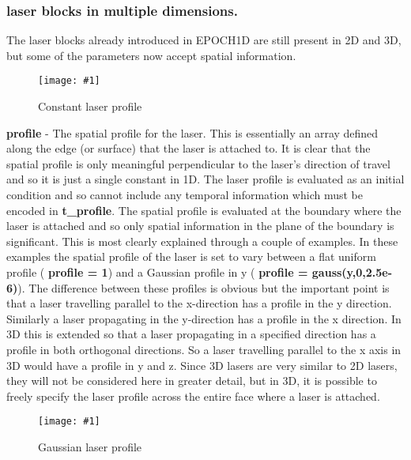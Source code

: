 \documentclass[12pt,a4paper]{article}
\newcommand{\emphtext}{\color{warwickdark} \fontfamily{phv}\selectfont\large\bf}
\newcommand{\inlineemph}[1]{{\color{warwicklight} \bf{#1}}}
\newcommand{\scaledcapimage}[4]
  {{\begin{figure}[hbt!]\centering\texttt{[image: \#1]}\caption{#3}
    \label{#2} \end{figure}}}
\begin{document}
\subsubsection{\inlineemph{laser} blocks in multiple dimensions.}
\label{sec:multilaser}

The laser blocks already introduced in EPOCH1D are still present in
2D and 3D, but some of the parameters now accept spatial information.\\

\scaledcapimage{./images/profile_flat}{flatlaser}{Constant laser profile}{0.4}

{\emphtext profile} - The spatial profile for the laser. This is
essentially an array defined along the edge (or surface) that the laser is
attached to. It is clear that the spatial profile is only meaningful
perpendicular to the laser's direction of travel and so it is just a single
constant in 1D. The laser profile is evaluated as an initial condition
and so cannot include any temporal information which must be
encoded in \inlineemph{t\_profile}.  The spatial profile is evaluated at the
boundary where the laser is attached and so only spatial information in the
plane of the boundary is significant. This is most clearly explained through a
couple of examples. In these examples the spatial profile of the laser is set
to vary between a flat uniform profile (\inlineemph{profile = 1}) and a
Gaussian profile in y (\inlineemph{profile = gauss(y,0,2.5e-6)}). The
difference between these profiles is obvious but the important point is that a
laser travelling parallel to the x-direction has a profile in the y
direction. Similarly a laser propagating in the y-direction has a profile in
the x direction. In 3D this is extended so that a laser propagating in a
specified direction has a profile in both orthogonal directions. So a laser
travelling parallel to the x axis in 3D would have a profile in y and z. Since
3D lasers are very similar to 2D lasers, they will not be considered here in
greater detail, but in 3D, it is possible to freely specify the laser profile
across the entire face where a laser is attached.\\

\scaledcapimage{./images/profile_gauss}{gausslaser}{Gaussian laser profile}{0.4}
\end{document}
